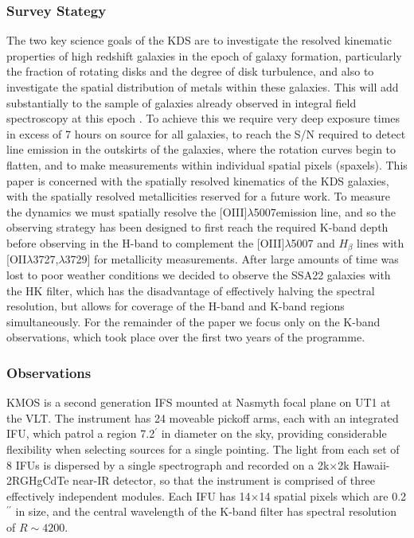 \documentclass[fleqn,usenatbib]{mn2e}
\begin{document}
\subsubsection{Survey Stategy}
The two key science goals of the KDS are to investigate the resolved kinematic properties of high redshift galaxies in the epoch of galaxy formation, particularly the fraction of rotating disks and the degree of disk turbulence, and also to investigate the spatial distribution of metals within these galaxies.
This will add substantially to the sample of galaxies already observed in integral field spectroscopy at this epoch \citep{Cresci2010,Gnerucci2011}.
To achieve this we require very deep exposure times in excess of 7 hours on source for all galaxies, to reach the S/N required to detect line emission in the outskirts of the galaxies, where the rotation curves begin to flatten, and to make measurements within individual spatial pixels (spaxels).
This paper is concerned with the spatially resolved kinematics of the KDS galaxies, with the spatially resolved metallicities reserved for a future work.
To measure the dynamics we must spatially resolve the [OIII]$\lambda$5007emission line, and so the observing strategy has been designed to first reach the required K-band depth before observing in the H-band to complement the [OIII]$\lambda$5007 and $H_{\beta}$ lines with [OII$\lambda$3727,$\lambda$3729] for metallicity measurements.
After large amounts of time was lost to poor weather conditions we decided to observe the SSA22 galaxies with the HK filter, which has the disadvantage of effectively halving the spectral resolution, but allows for coverage of the H-band and K-band regions simultaneously.
For the remainder of the paper we focus only on the K-band observations, which took place over the first two years of the programme. 
\subsubsection{Observations}\label{subsub:Obs}
KMOS is a second generation IFS mounted at Nasmyth focal plane on UT1 at the VLT.
The instrument has 24 moveable pickoff arms, each with an integrated IFU, which patrol a region 7.2$^{\prime}$ in diameter on the sky, providing considerable flexibility when selecting sources for a single pointing.
The light from each set of 8 IFUs is dispersed by a single spectrograph and recorded on a 2k$\times$2k Hawaii-2RGHgCdTe near-IR detector, so that the instrument is comprised of three effectively independent modules.
Each IFU has 14$\times$14 spatial pixels which are 0.2$^{\prime\prime}$ in size, and the central wavelength of the K-band filter has spectral resolution of $R \sim 4200$.
\end{document}
